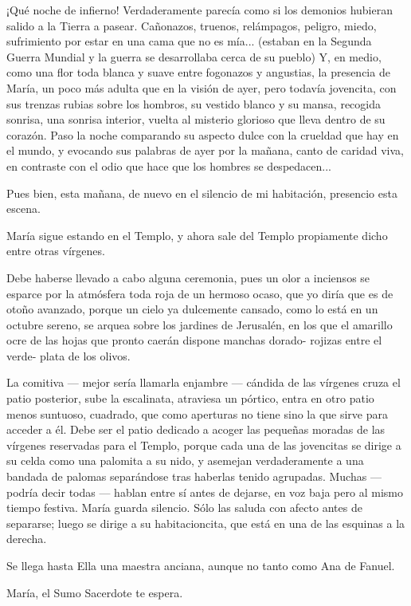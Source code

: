 \documentclass[12pt]{book} %
\begin{document}
¡Qué noche de infierno! Verdaderamente parecía como si los demonios hubieran salido a la Tierra a pasear. Cañonazos, truenos, relámpagos, peligro, miedo, sufrimiento por estar en una cama que no es mía... (estaban en la Segunda Guerra Mundial y la guerra se desarrollaba cerca de su pueblo) Y, en medio, como una flor toda blanca y suave entre fogonazos y angustias, la presencia de María, un poco más adulta que en la visión de ayer, pero todavía jovencita, con sus trenzas rubias sobre los hombros, su vestido blanco y su mansa, recogida sonrisa, una sonrisa interior, vuelta al misterio glorioso que lleva dentro de su corazón. Paso la noche comparando su aspecto dulce con la crueldad que hay en el mundo, y evocando sus palabras de ayer por la mañana, canto de caridad viva, en contraste con el odio que hace que los hombres se despedacen... 

Pues bien, esta mañana, de nuevo en el silencio de mi habitación, presencio esta escena. 

María sigue estando en el Templo, y ahora sale del Templo propiamente dicho entre otras vírgenes. 

Debe haberse llevado a cabo alguna ceremonia, pues un olor a inciensos se esparce por la atmósfera toda roja de un hermoso ocaso, que yo diría que es de otoño avanzado, porque un cielo ya dulcemente cansado, como lo está en un octubre sereno, se arquea sobre los jardines de Jerusalén, en los que el amarillo ocre de las hojas que pronto caerán dispone manchas dorado- rojizas entre el verde- plata de los olivos. 

La comitiva — mejor sería llamarla enjambre — cándida de las vírgenes cruza el patio posterior, sube la escalinata, atraviesa un pórtico, entra en otro patio menos suntuoso, cuadrado, que como aperturas no tiene sino la que sirve para acceder a él. Debe ser el patio dedicado a acoger las pequeñas moradas de las vírgenes reservadas para el Templo, porque cada una de las jovencitas se dirige a su celda como una palomita a su nido, y asemejan verdaderamente a una bandada de palomas separándose tras haberlas tenido agrupadas. Muchas — podría decir todas — hablan entre sí antes de dejarse, en voz baja pero al mismo tiempo festiva. María guarda silencio. Sólo las saluda con afecto antes de separarse; luego se dirige a su habitacioncita, que está en una de las esquinas a la derecha. 

Se llega hasta Ella una maestra anciana, aunque no tanto como Ana de Fanuel. 

María, el Sumo Sacerdote te espera. 
\end{document}
